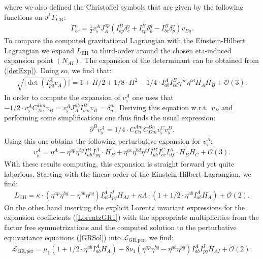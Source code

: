 where we also defined the Christoffel symbols that are given by the following functions on $J^1F_{\text{GR}}$:
\begin{align}
\Gamma^a_{bc} = \frac{1}{2} v_{\flat}^A J_A^{ap} \left ( I^B_{bp}\delta^q_c + I^B_{cp}\delta^q_b - I^B_{bc}\delta^q_p  \right ) v_{Bq}.
\end{align}
To compare the computed gravitational Lagrangian with the Einstein-Hilbert Lagrangian we expand $L_{\text{EH}}$ to third-order around the chosen eta-induced expansion point $(N_{AI})$. The expansion of the determinant can be obtained from (\ref{detExp}). Doing so, we find that:
\begin{align}
   \sqrt{\vert \operatorname{det} \left ( I^A_{pq}v_A \right ) \vert } = 1 + H/2 +1/8 \cdot H^2 - 1/4 \cdot I^A_{ab}I^B_{cd} \eta^{ac} \eta^{bd} H_A H_B + \mathcal{O}(3).   
\end{align}
In order to compute the expansion of $v^A_{\flat}$ one uses that $-1/2 \cdot v_{\flat}^AC_{An}^{Bm}v_B = v_{\flat}^A J_A^{nb}I^B_{bm}v_B = \delta^m_n$. Deriving this equation w.r.t.\ $v_B$ and performing some simplifications one thus finds the usual expression:
\begin{align}
    \partial^Bv_{\flat}^A = 1/4 \cdot C_{Cn}^{Am}C_{Dm}^{Bn}v_{\flat}^C v_{\flat}^{D}.
\end{align}
Using this one obtains the following perturbative expansion for $v_{\flat}^A$:
\begin{align}
    v_{\flat}^A = \eta^A - \eta^{ap}\eta^{bq} I^B_{ab} I^A_{pq} \cdot H_B + \eta^{ac}\eta^{bd}\eta^{ef} I^B_{ab} I^C_{ce} I^A_{df} \cdot H_BH_C + \mathcal{O}(3).  
\end{align}
With these results computing, this expansion is straight forward yet quite laborious.
Starting with the linear-order of the Einstein-Hilbert Lagrangian, we find:
\begin{align}
        L_{\text{EH}} = \kappa \cdot (\eta^{ap}\eta^{bq} - \eta^{ab}\eta^{pq}) I^{A}_{ab}I^{I}_{pq} H_{AI} + \kappa \Lambda \cdot (1 + 1/2 \cdot \eta^{ab} I_{ab}^A H_A) + \mathcal{O}(2).
\end{align}
On the other hand inserting the explicit Lorentz invariant expressions for the expansion coefficients (\ref{LorentzGR1}) with the appropriate multiplicities from the factor free symmetrizations and the computed solution to the perturbative equivariance equations (\ref{GRSol}) into $\mathcal{L}_{\text{GR,per}}$, we find:
\begin{align}
    \mathcal{L}_{\text{GR,per}} = \mu_1(1 + 1/2 \cdot \eta^{ab} I_{ab}^A H_A) - 8 \nu_1 \left(\eta^{ap}\eta^{bq} - \eta^{ab}\eta^{pq} \right )I^{A}_{ab}I^{I}_{pq} H_{AI} + \mathcal{O}(2).
\end{align}
